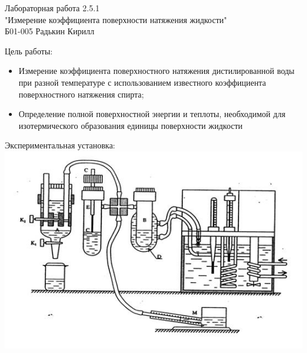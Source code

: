 \documentclass[12pt,a4paper,fleqn]{article}
\begin{document}
    \begin{center}
        Лабораторная работа 2.5.1
        \\
        "Измерение коэффициента поверхности натяжения жидкости"
        \\
        Б01-005 Радькин Кирилл
    \end{center}
    Цель работы:
    \begin{itemize}
        \item Измерение коэффициента поверхностного натяжения дистилированной воды при разной температуре с использованием известного коэффициента поверхностного натяжения спирта; 
        \item Определение полной поверхностной энергии и теплоты, необходимой для изотермического образования единицы поверхности жидкости
    \end{itemize}

    Экспериментальная установка: \\
    \includegraphics[scale=0.8]{image001_35.jpg}
\end{document}
